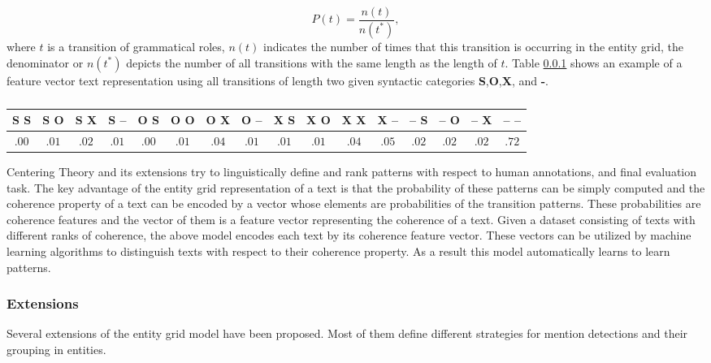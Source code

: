 \begin{equation}
P(t) = \frac{n(t)}{n(t^*)},
\end{equation}
where $t$ is a transition of grammatical roles, $n(t)$ indicates the number of times that this transition is occurring in the entity grid, the denominator or $n(t^*)$ depicts the number of all transitions with the same length as the length of $t$. 
Table \ref{} shows an example of a feature vector text representation using all transitions of length two given syntactic categories \textbf{S},\textbf{O},\textbf{X}, and \textbf{-}.

\begin{table}
\centering
\begin{tabular}{@{}cccccccccccccccc@{}}
\hline
S S & S O  & S X & S -- & O S  & O O  & O X  & O -- & X S  & X O  & X X & 	X -- & -- S  & -- O  & -- X & -- -- \\\hline
$.00$ & $.01$  & $.02$ & $.01$  & $.00$  & $.01$  & $.04$  & $.01$  & $.01$  & $.01$  & $.04$ & $.05$  & $.02$  & $.02$  & $.02$ & $.72$ \\
\hline
\end{tabular}
\caption{}
\end{table}


Centering Theory and its extensions try to linguistically define and rank patterns with respect to human annotations, and final evaluation task. 
The key advantage of the entity grid representation of a text is that the probability of these patterns can be simply computed and
the coherence property of a text can be encoded by a vector whose elements are probabilities of the transition patterns. 
These probabilities are coherence features and the vector of them is a feature vector representing the coherence of a text. 
Given a dataset consisting of texts with different ranks of coherence, the above model encodes each text by its coherence feature vector.  
These vectors can be utilized by machine learning algorithms to distinguish texts with respect to their coherence property. 
As a result this model automatically learns to learn patterns.

\subsubsection{Extensions}
%
Several extensions of the entity grid model have been proposed. 
Most of them define different strategies for mention detections and their grouping in entities. 

